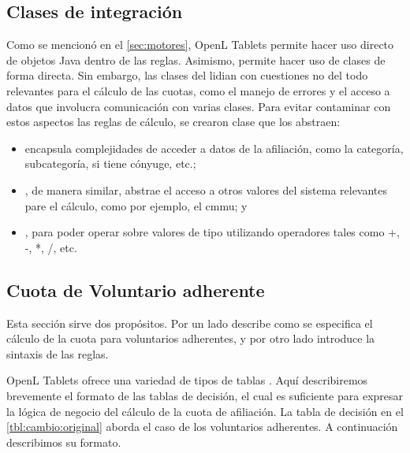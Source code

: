 \subsection{Clases de integración}\label{ssec:integracion:clases}

Como se mencionó en el \cref{sec:motores}, OpenL Tablets permite hacer uso directo de objetos Java dentro de las reglas.
Asimismo, permite hacer uso de clases de forma directa.
Sin embargo, las clases del {\SIDOSPU} lidian con cuestiones no del todo relevantes para el cálculo de las cuotas, como el manejo de errores y el acceso a datos que involucra comunicación con varias clases.
Para evitar contaminar con estos aspectos las reglas de cálculo, se crearon clase que los abstraen:
\begin{itemize}
    \item {} encapsula complejidades de acceder a datos de la afiliación, como la categoría, subcategoría, si tiene cónyuge, etc.;
    \item {}, de manera similar, abstrae el acceso a otros valores del sistema relevantes pare el cálculo, como por ejemplo, el \acrshort{cmmu}; y
    \item {}, para poder operar sobre valores de tipo  utilizando operadores tales como +, -, *, /, etc.
\end{itemize}

\subsection{Cuota de Voluntario adherente}


Esta sección sirve dos propósitos.
Por un lado describe como se especifica el cálculo de la cuota para voluntarios adherentes, y por otro lado introduce la sintaxis de las reglas.

OpenL Tablets ofrece una variedad de tipos de tablas \cite{openl}.
Aquí describiremos brevemente el formato de las tablas de decisión, el cual es suficiente para expresar la lógica de negocio del cálculo de la cuota de afiliación.
%
La tabla de decisión en el \cref{tbl:cambio:original} aborda el caso de los voluntarios adherentes.
A continuación describimos su formato.

